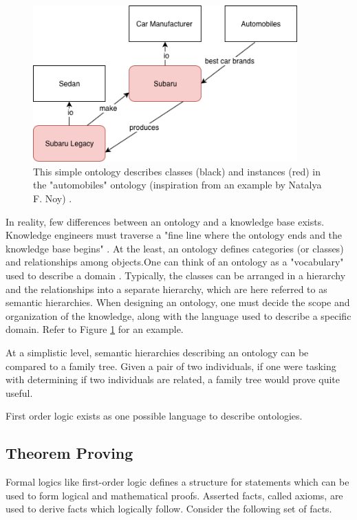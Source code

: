 \documentclass{article}
\begin{document}
\begin{figure}[h]
\centering
\includegraphics[width=4in]{sample_ontology}
\caption{This simple ontology describes classes (black) and instances (red) in the "automobiles" ontology (inspiration from an example by Natalya F. Noy) \cite{noy2001ontology}.}
\label{fig:sample_ontology}
\end{figure}

 
In reality, few differences between an ontology and a knowledge base exists. Knowledge engineers must traverse a "fine line where the ontology ends and the knowledge base begins" \cite{noy2001ontology}. At the least, an ontology defines categories (or classes) and relationships among objects.One can think of an ontology as a "vocabulary" used to describe a domain \cite[308]{russell2016artificial}. Typically, the classes can be arranged in a hierarchy and the relationships into a separate hierarchy, which are here referred to as semantic hierarchies. When designing an ontology, one must decide the scope and organization of the knowledge, along with the language used to describe a specific domain. Refer to Figure \ref{fig:sample_ontology} for an example. 



At a simplistic level, semantic hierarchies describing an ontology can be compared to a family tree. Given a pair of two individuals, if one were tasking with determining if two individuals are related, a family tree would prove quite useful. 

First order logic exists as one possible language to describe ontologies. 

\subsection{{Theorem Proving}}
Formal logics like first-order logic defines a structure for statements which can be used to form logical and mathematical proofs. Asserted facts, called axioms, are used to derive facts which logically follow. Consider the following set of facts. 
\end{document}
